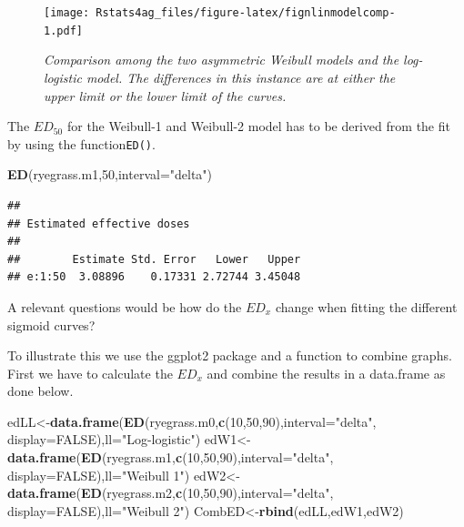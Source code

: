 \documentclass[letterpaper,]{book}
\newenvironment{Shaded}{\begin{snugshade}}{\end{snugshade}}
\newcommand{\DataTypeTok}[1]{\textcolor[rgb]{0.13,0.29,0.53}{#1}}
\newcommand{\DecValTok}[1]{\textcolor[rgb]{0.00,0.00,0.81}{#1}}
\newcommand{\KeywordTok}[1]{\textcolor[rgb]{0.13,0.29,0.53}{\textbf{#1}}}
\newcommand{\NormalTok}[1]{#1}
\newcommand{\OtherTok}[1]{\textcolor[rgb]{0.56,0.35,0.01}{#1}}
\newcommand{\StringTok}[1]{\textcolor[rgb]{0.31,0.60,0.02}{#1}}
\begin{document}
\begin{figure}
\centering
\texttt{[image: Rstats4ag\_files/figure-latex/fignlinmodelcomp-1.pdf]}
\caption{\label{fig:fignlinmodelcomp}\emph{Comparison among the two asymmetric Weibull models and the log-logistic model. The differences in this instance are at either the upper limit or the lower limit of the curves.}}
\end{figure}

The \(ED_{50}\) for the Weibull-1 and Weibull-2 model has to be derived from the fit by using the function\texttt{ED()}.

\begin{Shaded}
\begin{Highlighting}[]
 \KeywordTok{ED}\NormalTok{(ryegrass.m1,}\DecValTok{50}\NormalTok{,}\DataTypeTok{interval=}\StringTok{"delta"}\NormalTok{)}
\end{Highlighting}
\end{Shaded}

\begin{verbatim}
## 
## Estimated effective doses
## 
##        Estimate Std. Error   Lower   Upper
## e:1:50  3.08896    0.17331 2.72744 3.45048
\end{verbatim}

A relevant questions would be how do the \(ED_{x}\) change when fitting the different sigmoid curves?

To illustrate this we use the ggplot2 package and a function to combine graphs. First we have to calculate the \(ED_{x}\) and combine the results in a data.frame as done below.

\begin{Shaded}
\begin{Highlighting}[]
\NormalTok{edLL<-}\KeywordTok{data.frame}\NormalTok{(}\KeywordTok{ED}\NormalTok{(ryegrass.m0,}\KeywordTok{c}\NormalTok{(}\DecValTok{10}\NormalTok{,}\DecValTok{50}\NormalTok{,}\DecValTok{90}\NormalTok{),}\DataTypeTok{interval=}\StringTok{"delta"}\NormalTok{, }
                    \DataTypeTok{display=}\OtherTok{FALSE}\NormalTok{),}\DataTypeTok{ll=}\StringTok{"Log-logistic"}\NormalTok{)            }
\NormalTok{edW1<-}\KeywordTok{data.frame}\NormalTok{(}\KeywordTok{ED}\NormalTok{(ryegrass.m1,}\KeywordTok{c}\NormalTok{(}\DecValTok{10}\NormalTok{,}\DecValTok{50}\NormalTok{,}\DecValTok{90}\NormalTok{),}\DataTypeTok{interval=}\StringTok{"delta"}\NormalTok{, }
                    \DataTypeTok{display=}\OtherTok{FALSE}\NormalTok{),}\DataTypeTok{ll=}\StringTok{"Weibull 1"}\NormalTok{)}
\NormalTok{edW2<-}\KeywordTok{data.frame}\NormalTok{(}\KeywordTok{ED}\NormalTok{(ryegrass.m2,}\KeywordTok{c}\NormalTok{(}\DecValTok{10}\NormalTok{,}\DecValTok{50}\NormalTok{,}\DecValTok{90}\NormalTok{),}\DataTypeTok{interval=}\StringTok{"delta"}\NormalTok{, }
                    \DataTypeTok{display=}\OtherTok{FALSE}\NormalTok{),}\DataTypeTok{ll=}\StringTok{"Weibull 2"}\NormalTok{)}
\NormalTok{CombED<-}\KeywordTok{rbind}\NormalTok{(edLL,edW1,edW2)}
\end{Highlighting}
\end{Shaded}
\end{document}
